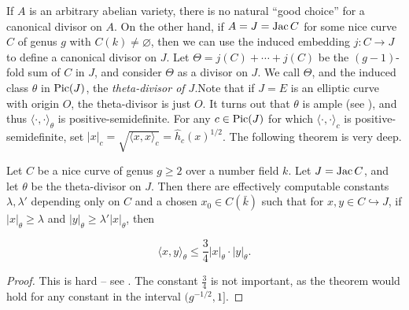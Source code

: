\documentclass{article}
\begin{document}
If $A$ is an arbitrary abelian variety, there is no natural ``good choice'' for 
a canonical divisor on $A$. On the other hand, if $A=J=\operatorname{Jac} C$ for some nice 
curve $C$ of genus $g$ with $C(k)\ne\varnothing$, then we can use the induced 
embedding $j:C\to J$ to define a canonical divisor on $J$. Let 
$\Theta=j(C)+\cdots + j(C)$ be the $(g-1)$-fold sum of $C$ in $J$, and consider 
$\Theta$ as a divisor on $J$. We call $\Theta$, and the induced class $\theta$ 
in $\operatorname{Pic}(J)$, the \emph{theta-divisor of $J$}.Note that if $J=E$ is an elliptic 
curve with origin $O$, the theta-divisor is just $O$.  It turns out that 
$\theta$ is ample (see \cite[8.10.22]{bg06}), and thus 
$\langle\cdot,\cdot\rangle_\theta$ is positive-semidefinite. For any 
$c\in \operatorname{Pic}(J)$ for which $\langle\cdot,\cdot\rangle_c$ is 
positive-semidefinite, set 
$|x|_c=\sqrt{\langle x,x\rangle_c} = \widehat h_c(x)^{1/2}$. The following 
theorem is very deep.

\begin{theorem}
Let $C$ be a nice curve of genus $g\geqslant 2$ over a number field $k$. Let 
$J=\operatorname{Jac} C$, and let $\theta$ be the theta-divisor on $J$. Then there are 
effectively computable constants $\lambda,\lambda'$ depending only on $C$ and 
a chosen $x_0\in C(\bar k)$ such that for $x,y\in C\hookrightarrow J$, if 
$|x|_\theta\geqslant \lambda$ and 
$|y|_\theta\geqslant \lambda'|x|_\theta$, then 

\[
  \langle x,y\rangle_\theta \leqslant \frac 3 4 |x|_\theta\cdot |y|_\theta\text{.}
\]
\end{theorem}
\begin{proof}
This is hard -- see \cite[11.9.1]{bg06}. The constant $\frac 3 4$ is not 
important, as the theorem would hold for any constant in the interval 
$(g^{-1/2},1]$. 
\end{proof}










\end{document}
